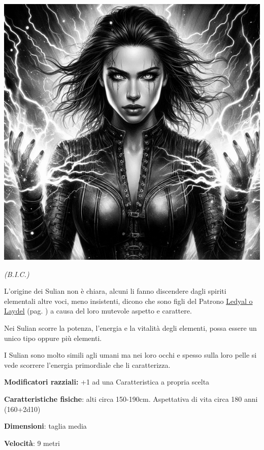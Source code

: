 \begin{multicols}{2}
\begin{center}

\includegraphics[width=0.7\linewidth]{immagini/sulian4-ai.png}

\textit{(B.I.C.)}

\end{center}

%

L'origine dei Sulian non è chiara, alcuni li fanno discendere dagli spiriti elementali altre voci, meno insistenti, dicono che sono figli del Patrono \hyperlink{ledyal}{Ledyal o Laydel} (pag. \pageref{ledyal}) a causa del loro mutevole aspetto e carattere.

Nei Sulian scorre la potenza, l'energia e la vitalità degli elementi, possa essere un unico tipo oppure più elementi.

I Sulian sono molto simili agli umani ma nei loro occhi e spesso sulla loro pelle si vede scorrere l'energia primordiale che li caratterizza.

\textbf{Modificatori razziali:} +1 ad una Caratteristica a propria scelta

\textbf{Caratteristiche fisiche}: alti circa 150-190cm. Aspettativa di vita circa 180 anni (160+2d10)

\textbf{Dimensioni}: taglia media

\textbf{Velocità}: 9 metri


\end{multicols}
